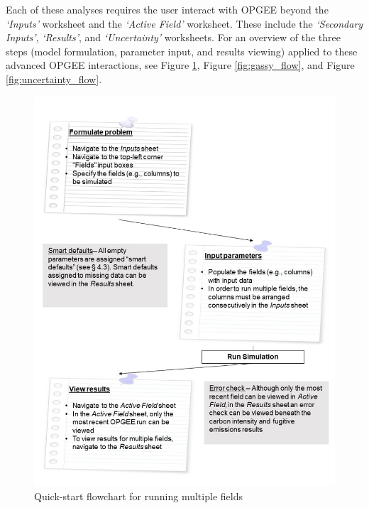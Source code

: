 \documentclass[11pt]{report}
\newcommand{\sheet}[1]{\textit{`{#1}'}}
\begin{document}
Each of these analyses requires the user interact with OPGEE beyond the \sheet{Inputs} worksheet and the \sheet{Active Field} worksheet. These include the \sheet{Secondary Inputs}, \sheet{Results}, and \sheet{Uncertainty} worksheets. For an overview of the three steps (model formulation, parameter input, and results viewing) applied to these advanced OPGEE interactions, see Figure \ref{fig:multiple_flow}, Figure \ref{fig:gassy_flow}, and Figure \ref{fig:uncertainty_flow}.

\clearpage

\begin{figure}[t]
\includegraphics[width=1\columnwidth]{documentation/images/User_Guide_figs/multiple.jpg}
\caption{Quick-start flowchart for running multiple fields}
\label{fig:multiple_flow}
\end{figure}

\clearpage
\end{document}
